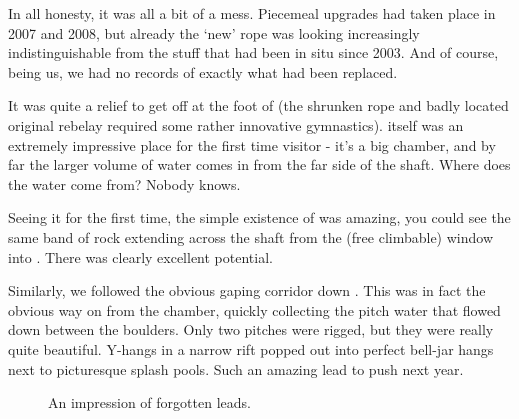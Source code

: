 In all honesty, it was all a bit of a mess. Piecemeal upgrades had taken
place in 2007 and 2008, but already the `new' rope was looking
increasingly indistinguishable from the stuff that had been in situ
since 2003. And of course, being us, we had no records of exactly what
had been replaced.

It was quite a relief to get off at the foot of  (the
shrunken rope and badly located original rebelay required some rather
innovative gymnastics).  itself was an extremely impressive
place for the first time visitor - it's a big chamber, and by far the
larger volume of water comes in from the far side of the shaft. Where
does the water come from? Nobody knows.

Seeing it for the first time, the simple existence of  was
amazing, you could see the same band of rock extending across the
 shaft from the (free climbable) window into . There was clearly excellent potential.

Similarly, we followed the obvious gaping corridor down . This was in fact the obvious way on from the 
chamber, quickly collecting the pitch water that flowed down between the
boulders. Only two pitches were rigged, but they were really quite
beautiful. Y-hangs in a narrow rift popped out into perfect bell-jar
hangs next to picturesque splash pools. Such an amazing lead to push
next year.

\begingroup
\setlength{\fboxrule}{0pt}
\begin{figure}[t!]
\checkoddpage \ifoddpage \forcerectofloat \else \forceversofloat \fi
\centering
 \caption{An impression of forgotten leads. }
 \label{korita ignored}
\end{figure}
\endgroup



